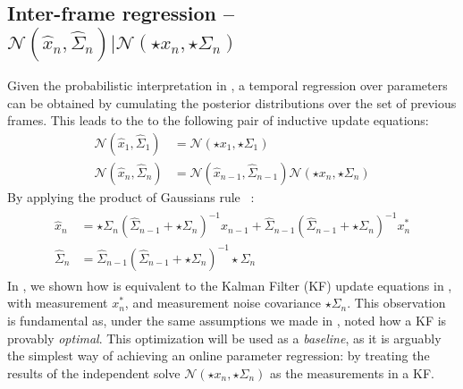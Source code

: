 \subsection{Inter-frame regression -- $\mathcal{N}(\hat{x}_n, \hat{\Sigma}_n) | \mathcal{N}(\star{x}_n, \star{\Sigma}_n)$ } 
\label{sec:combining}
\label{sec:inter}
Given the probabilistic interpretation in , a temporal regression over parameters can be obtained by cumulating the posterior distributions over the set of previous frames. This leads to the to the following pair of inductive update equations:
% 
\begin{align}
\mathcal{N}(\hat{x}_1, \hat{\Sigma}_1) &= \mathcal{N}(\star{x}_1, \star{\Sigma}_1) \\
\mathcal{N}(\hat{x}_n, \hat{\Sigma}_n) &= \mathcal{N}(\hat{x}_{n-1}, \hat{\Sigma}_{n-1}) \mathcal{N}(\star{x}_n, \star{\Sigma}_n)
\end{align}
% 
By applying the product of Gaussians rule ~\cite{petersen2008matrix}:
% 
\begin{align}
\begin{split}
\hat{x}_{n} &= \star\Sigma_{n} (\hat{\Sigma}_{n-1} + \star\Sigma_{n})^{-1} \hat{x}_{n-1} + 
\hat{\Sigma}_{n-1} (\hat{\Sigma}_{n-1} + \star\Sigma_n)^{-1} x_n^*
\\
\hat{\Sigma}_n &= \hat{\Sigma}_{n-1} (\hat{\Sigma}_{n-1} + {\star\Sigma_n})^{-1} \star\Sigma_n
\label{eq:combining}
\end{split}
\end{align}
% 
In , we shown how  is equivalent to the Kalman Filter (KF) update equations in , with measurement $x_n^*$, and measurement noise covariance $\star\Sigma_n$. This observation is fundamental as, under the same assumptions we made in , \cite[]{maybeck1979stochastic} noted how a KF is provably \emph{optimal}.
This optimization will be used as a \emph{baseline}, as it is arguably the simplest way of achieving an online parameter regression: by treating the results of the independent solve $\mathcal{N}(\star{x}_n, \star{\Sigma}_n)$ as the measurements in a KF.


